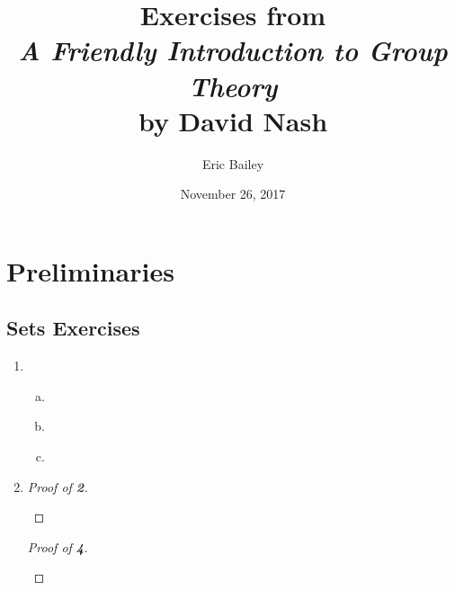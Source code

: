 \documentclass[12pt]{amsart}
\title{%
  Exercises from \\
  {\sl A Friendly Introduction to Group Theory} \\
  by David Nash%
}
\author{Eric Bailey}
\date{November 26, 2017}
\def\Circled#1{{\Large \textcircled{\small \bf #1}}}
\def\exercise#1#2{%
  \inputminted{gap}{gap/#1/#2.g}%
  \inputminted{gap}{answers/#1/#2.txt}%
}
\begin{document}
\maketitle
\tableofcontents
\newpage

\section{Preliminaries}

\subsection{Sets Exercises}

\begin{enumerate}[{\bf 1.}]
\item
  \begin{enumerate}[(a)]
  \item \exercise{1.1}{1a} \newpage
  \item \exercise{1.1}{1b}
  \item \exercise{1.1}{1c}
  \end{enumerate} \newpage

\item
  \begin{sideways}
    \begin{minipage}{\textheight}
      \begin{proof}[Proof of \Circled{2}]
        \begin{prooftree*}
           

           




        \end{prooftree*}
      \end{proof}

      \begin{proof}[Proof of \Circled{4}]
        \begin{prooftree*}


\end{prooftree*}
\end{proof}
\end{minipage}
\end{sideways}
\end{enumerate}
\end{document}

